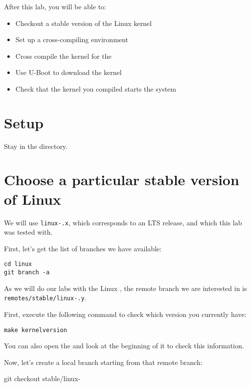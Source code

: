 
After this lab, you will be able to:
\begin{itemize}
\item Checkout a stable version of the Linux kernel
\item Set up a cross-compiling environment
\item Cross compile the kernel for the \labboarddescription
\item Use U-Boot to download the kernel
\item Check that the kernel you compiled starts the system
\end{itemize}

\section{Setup}

Stay in the  directory.

\section{Choose a particular stable version of Linux}

We will use \texttt{linux-\workingkernel.x}, which corresponds to an
LTS release, and which this lab was tested with.

First, let's get the list of branches we have available:

\begin{verbatim}
cd linux
git branch -a
\end{verbatim}

As we will do our labs with the Linux \workingkernel,
the remote branch we are interested in is\\%
\texttt{remotes/stable/linux-\workingkernel.y}.

First, execute the following command to check which version you
currently have:

\begin{verbatim}
make kernelversion
\end{verbatim}

You can also open the  and look at the beginning of it
to check this information.

Now, let's create a local branch starting from that remote branch:
\begin{bashinput}
git checkout stable/linux-%
\end{bashinput}

